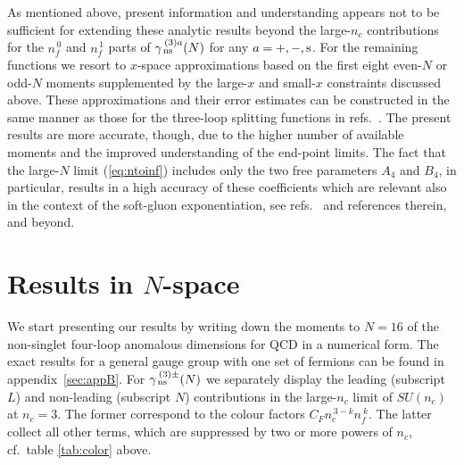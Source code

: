 \documentclass[12pt]{article}
\def\nc{{n_c}}
\def\cf{{C^{}_F}}
\def\nfz{{n^{\,0}_{\! f}}}
\def\nfo{{n^{\,1}_{\! f}}}
\begin{document}
As mentioned above, present information and understanding appears not to 
be sufficient for extending these analytic results beyond the large-$\nc$ 
contributions for the $\nfz$ and $\nfo$ parts of $\gamma_{\,\rm ns}^{\:(3)a}(N)$
for any $a = +, -, \rm s$. For the remaining functions we resort to $x$-space
approximations based on the first eight even-$N$ or odd-$N$ moments 
supplemented by the large-$x$ and small-$x$ constraints discussed above.
These approximations and their error estimates can be constructed in the same 
manner as those for the three-loop splitting functions in 
refs.~\cite{vanNeerven:1999ca,vanNeerven:2000uj,vanNeerven:2000wp}. 
The present results are more accurate, though, due to the higher number of 
available moments and the improved understanding of the end-point limits.
The fact that the large-$N$ limit (\ref{eq:ntoinf}) includes only the two 
free parameters $A_4$ and $B_4$, in particular, results in a high accuracy 
of these coefficients which are relevant also in the context of the soft-gluon 
exponentiation, 
see refs.~\cite{Moch:2005ba,Moch:2005ky,Ravindran:2006cg,Ahmed:2014cla} 
and references therein, and beyond.

\newpage
 
%
\setcounter{equation}{0}
\section{Results in $N$-space}
\label{sec:Nres}

We start presenting our results by writing down the moments to $N=16$ of 
the non-singlet four-loop anomalous dimensions for QCD in a numerical form. 
The exact results for a general gauge group with one set of fermions can be 
found in appendix~\ref{sec:appB}.
For $\gamma_{\,\rm ns}^{\:(3)\pm}(N)$ we separately display the leading 
(subscript $L$) and non-leading (subscript $N$) contributions in the 
large-$\nc$ limit of $SU(\nc)$ at $\nc=3$. 
The former correspond to the colour factors $\cf n_c^{\,3-k} n_{\!f}^{\:k}$. 
The latter collect all other terms, which are suppressed by two or more powers 
of $\nc$, cf.~table \ref{tab:color} above.
\end{document}
